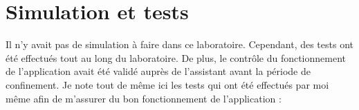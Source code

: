 \section{Simulation et tests}

Il n'y avait pas de simulation à faire dans ce laboratoire. Cependant, des tests ont été effectués tout au long du laboratoire. De plus, le contrôle du fonctionnement de l'application avait été validé auprès de l'assistant avant la période de confinement. Je note tout de même ici les tests qui ont été effectués par moi même afin de m'assurer du bon fonctionnement de l'application : 